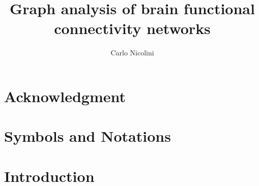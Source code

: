 %


\title{Graph analysis of brain functional connectivity networks}
\author{Carlo Nicolini}


\maketitle
{}

\chapter*{Acknowledgment}


\chapter*{Symbols and Notations}



%


\chapter{Introduction}\label{chap:introduction}
	

% 	

% 	

% 	

% 	





% 	

